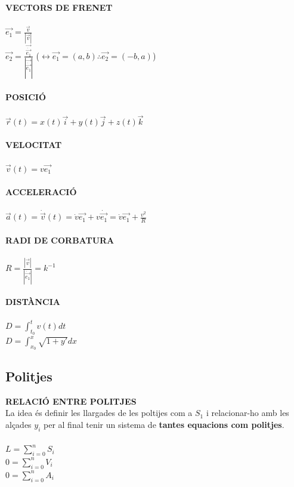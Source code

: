 \documentclass[11pt]{article}
\begin{document}
\begin{tcolorbox}[
  title=Fórmues bàsiques,
  colback=RoyalPurple!5!white,
  colframe=RoyalPurple!70!black,
  coltitle=white,
  colbacktitle=RoyalPurple!70!black,
  fonttitle=\bfseries,
  arc=6pt,
  boxrule=0.8pt
]

\textbf{VECTORS DE FRENET}\\ 
\\
$\vec{e_1} = \frac{\vec{v}}{\left|\vec{v}\right|}$\\
$\vec{e_2} = \frac{\vec{\dot{\vec{e_1}}}}{\left|\vec{\dot{\vec{e_1}}}\right|}$ ($\leftrightarrow \vec{e_1} = (a,b) \therefore \vec{e_2} = (-b,a)$)\\
\\
\textbf{POSICIÓ}\\
\\
$\vec{r}(t) = x(t)\vec{i} + y(t)\vec{j} + z(t)\vec{k}$ \\
\\
\textbf{VELOCITAT}\\ 
\\
$\vec{v}(t) = v \vec{e_1}$\\
\\
\textbf{ACCELERACIÓ}\\
\\
$\vec{a}(t) = \dot{\vec{v}}(t) = \dot{v}\vec{e_1} + v\dot{\vec{e_1}} = \dot{v}\vec{e_1} + \frac{v^2}{R}$\\
\\
\textbf{RADI DE CORBATURA}\\
\\
$R = \frac{\left|\vec{v}\right|}{\left|\dot{\vec{e_1}}\right|} = k^{-1}$\\
\\
\textbf{DISTÀNCIA}\\
\\
$D = \int_{t_0}^{t} v(t) dt$\\
$D = \int_{x_0}^{x} \sqrt{1 + y'} dx$\\

\end{tcolorbox}

\subsection{Politjes}

\begin{tcolorbox}[
  title=Fórmues bàsiques,
  colback=BurntOrange!5!white,
  colframe=BurntOrange!70!black,
  coltitle=white,
  colbacktitle=BurntOrange!70!black,
  fonttitle=\bfseries,
  arc=6pt,
  boxrule=0.8pt
]

\textbf{RELACIÓ ENTRE POLITJES}\\ 

La idea és definir les llargades de les poltijes com a $S_1$ i relacionar-ho amb les alçades $y_i$ per al final tenir un sistema de \textbf{tantes equacions com politjes}.\\
\\
$L = \sum_{i = 0}^{n} S_i$\\
$0 = \sum_{i = 0}^{n} V_i$\\
$0 = \sum_{i = 0}^{n} A_i$\\
\end{tcolorbox}
\end{document}
